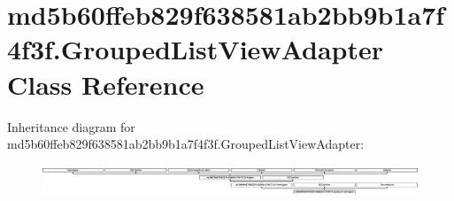 \hypertarget{classmd5b60ffeb829f638581ab2bb9b1a7f4f3f_1_1GroupedListViewAdapter}{}\section{md5b60ffeb829f638581ab2bb9b1a7f4f3f.\+Grouped\+List\+View\+Adapter Class Reference}
\label{classmd5b60ffeb829f638581ab2bb9b1a7f4f3f_1_1GroupedListViewAdapter}
Inheritance diagram for md5b60ffeb829f638581ab2bb9b1a7f4f3f.\+Grouped\+List\+View\+Adapter\+:\begin{figure}[H]
\begin{center}
\leavevmode
\includegraphics[height=0.947547cm]{classmd5b60ffeb829f638581ab2bb9b1a7f4f3f_1_1GroupedListViewAdapter}
\end{center}
\end{figure}

